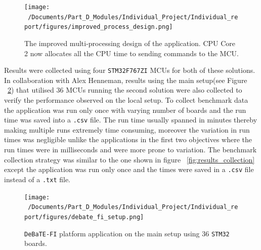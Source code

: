 \begin{figure}[htbp] %
	\centering
	\texttt{[image: ~/Documents/Part\_D\_Modules/Individual\_Project/Individual\_report/figures/improved\_process\_design.png]} %
	\caption{The improved multi-processing design of the application. CPU Core 2 now allocates all the CPU time to sending commands to the MCU.}
	\label{fig:improved_application_design} %
\end{figure}

Results were collected using four \texttt{STM32F767ZI} MCUs for both of these solutions. In collaboration with Alex Henneman, results using the main setup(see Figure ~\ref{fig:debate_fi_setup}) that utilised 36 MCUs running the second solution were also collected to verify the performance observed on the local setup. To collect benchmark data the application was run only once with varying number of boards and the run time was saved into a \texttt{.csv} file. The run time usually spanned in minutes thereby making multiple runs extremely time consuming, moreover the variation in run times was negligible unlike the applications in the first two objectives where the run times were in milliseconds and were more prone to variation. The benchmark collection strategy was similar to the one shown in figure ~\ref{fig:results_collection} except the application was run only once and the times were saved in a \texttt{.csv} file instead of a \texttt{.txt} file. 

\begin{figure}[htbp] %
	\centering
	\texttt{[image: ~/Documents/Part\_D\_Modules/Individual\_Project/Individual\_report/figures/debate\_fi\_setup.png]} %
	\caption{\texttt{DeBaTE-FI} platform application on the main setup using 36 \texttt{STM32} boards\cite{debate_fi_publication}.}
	\label{fig:debate_fi_setup} %
\end{figure}